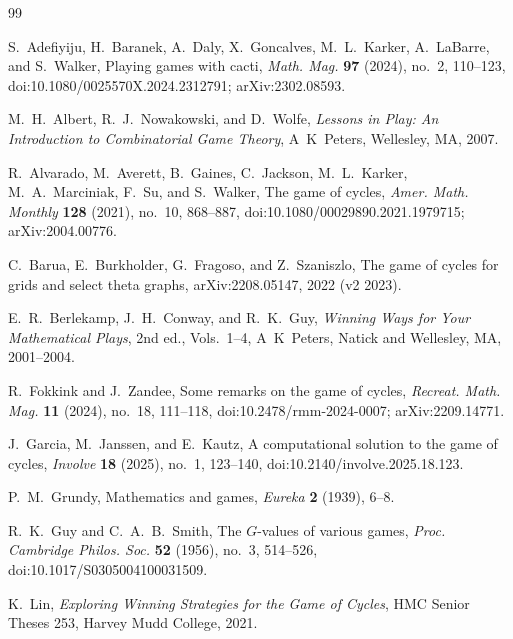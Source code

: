 \documentclass[11pt]{amsart}
\theoremstyle{definition}
\theoremstyle{remark}
\begin{document}
\begin{thebibliography}{99}

S.~Adefiyiju, H.~Baranek, A.~Daly, X.~Goncalves, M.~L.~Karker, A.~LaBarre, and S.~Walker,
\newblock Playing games with cacti,
\newblock \emph{Math. Mag.} \textbf{97} (2024), no.~2, 110--123, doi:10.1080/0025570X.2024.2312791; arXiv:2302.08593.

M.~H.~Albert, R.~J.~Nowakowski, and D.~Wolfe,
\newblock \emph{Lessons in Play: An Introduction to Combinatorial Game Theory},
\newblock A~K~Peters, Wellesley, MA, 2007.

R.~Alvarado, M.~Averett, B.~Gaines, C.~Jackson, M.~L.~Karker, M.~A.~Marciniak, F.~Su, and S.~Walker,
\newblock The game of cycles,
\newblock \emph{Amer. Math. Monthly} \textbf{128} (2021), no.~10, 868--887, doi:10.1080/00029890.2021.1979715; arXiv:2004.00776.

C.~Barua, E.~Burkholder, G.~Fragoso, and Z.~Szaniszlo,
\newblock The game of cycles for grids and select theta graphs,
\newblock arXiv:2208.05147, 2022 (v2 2023).

E.~R.~Berlekamp, J.~H.~Conway, and R.~K.~Guy,
\newblock \emph{Winning Ways for Your Mathematical Plays}, 2nd ed., Vols.~1--4,
\newblock A~K~Peters, Natick and Wellesley, MA, 2001--2004.

R.~Fokkink and J.~Zandee,
\newblock Some remarks on the game of cycles,
\newblock \emph{Recreat. Math. Mag.} \textbf{11} (2024), no.~18, 111--118, doi:10.2478/rmm-2024-0007; arXiv:2209.14771.

J.~Garcia, M.~Janssen, and E.~Kautz,
\newblock A computational solution to the game of cycles,
\newblock \emph{Involve} \textbf{18} (2025), no.~1, 123--140, doi:10.2140/involve.2025.18.123.

P.~M.~Grundy,
\newblock Mathematics and games,
\newblock \emph{Eureka} \textbf{2} (1939), 6--8.

R.~K.~Guy and C.~A.~B.~Smith,
\newblock The $G$-values of various games,
\newblock \emph{Proc. Cambridge Philos. Soc.} \textbf{52} (1956), no.~3, 514--526, doi:10.1017/S0305004100031509.

K.~Lin,
\newblock \emph{Exploring Winning Strategies for the Game of Cycles},
\newblock HMC Senior Theses 253, Harvey Mudd College, 2021.


\end{thebibliography}
\end{document}
